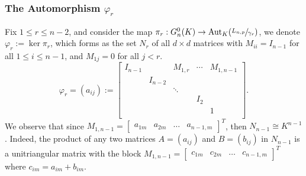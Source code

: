 \documentclass{article}
\begin{document}
\subsubsection{The Automorphism $\varphi_r$}
Fix $1\leq{r}\leq{n}-2$, and consider the map $\pi_r:G_n^0(K)\rightarrow\text{Aut}_{K}(\sfrac{{L}_{n,p}}{\gamma_r})$, we denote $\varphi_r:=\ker\pi_r$, which forms as the set $N_r$ of all $d\times{d}$ matrices with $M_{ii}=I_{n-1}$ for all $1\leq{i}\leq{n-1}$, and $M_{1j}=0$ for all $j<r$.
\[\varphi_r=(a_{ij}):=\begin{bmatrix}
    I_{n-1} &  & M_{1,r} & \cdots & M_{1,n-1} \\
     & I_{n-2} &  & & \\
     & & \ddots &  & \\
          & & & I_2 & \\
               & & & & 1\\
\end{bmatrix}.\]
We observe that since $M_{1,n-1}=\begin{bmatrix}a_{1m}&a_{2m}&\dots&a_{n-1,m}\end{bmatrix}^T$, then $N_{n-1}\cong{K}^{n-1}$. Indeed, the product of any two matrices $A=(a_{ij})$ and $B=(b_{ij})$ in $N_{n-1}$ is a unitriangular matrix with the block $M_{1,n-1}=\begin{bmatrix}
    c_{1m}&c_{2m}&\dots&c_{n-1,m}
\end{bmatrix}^T$ where $c_{im}=a_{im}+b_{im}$.

\end{document}
